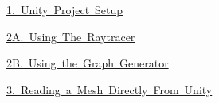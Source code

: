 
\begin{DoxyItemize}
\item \mbox{\hyperlink{_unity_project_setup}{1. Unity Project Setup}}
\item \mbox{\hyperlink{_using_the_raytracer}{2A. Using The Raytracer}}
\item \mbox{\hyperlink{_generating_a_graph}{2B. Using the Graph Generator}}
\item \mbox{\hyperlink{_mesh_from_unity}{3. Reading a Mesh Directly From Unity}} 
\end{DoxyItemize}
